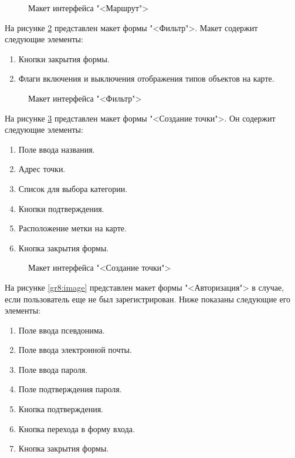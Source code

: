 \begin{figure}[ht]
	\center{\texttt{[image: gr7]}}
	\caption{Макет интерфейса "<Маршрут">}
	\label{gr7:image}
\end{figure}

На рисунке \ref{gr4:image} представлен макет формы "<Фильтр">. Макет содержит следующие элементы:

\begin{enumerate}
	\item Кнопки закрытия формы.
	\item Флаги включения и выключения отображения типов объектов на карте.
\end{enumerate}

\vspace{+80mm}
\begin{figure}[ht]
	\center{\texttt{[image: gr4]}}
	\caption{Макет интерфейса "<Фильтр">}
	\label{gr4:image}
\end{figure}

На рисунке \ref{gr5:image} представлен макет формы "<Создание точки">. Он содержит следующие элементы:

\begin{enumerate}
	\item Поле ввода названия.
	\item Адрес точки.
	\item Список для выбора категории.
	\item Кнопки подтверждения.
	\item Расположение метки на карте.
	\item Кнопка закрытия формы.
\end{enumerate}

\vspace{+80mm}
\begin{figure}[ht]
	\center{\texttt{[image: gr5]}}
	\caption{Макет интерфейса "<Создание точки">}
	\label{gr5:image}
\end{figure}

На рисунке \ref{gr8:image} представлен макет формы "<Авторизация"> в случае, если пользователь еще не был зарегистрирован. Ниже показаны следующие его элементы:

\begin{enumerate}
	\item Поле ввода псевдонима.
	\item Поле ввода электронной почты.
	\item Поле ввода пароля.
	\item Поле подтверждения пароля.
	\item Кнопка подтверждения.
	\item Кнопка перехода в форму входа.
	\item Кнопка закрытия формы.
\end{enumerate}

